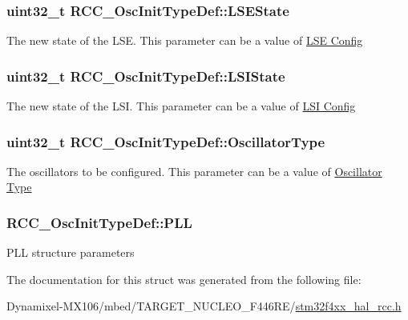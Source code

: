 \subsubsection[{\texorpdfstring{L\+S\+E\+State}{LSEState}}]{\setlength{\rightskip}{0pt plus 5cm}uint32\+\_\+t R\+C\+C\+\_\+\+Osc\+Init\+Type\+Def\+::\+L\+S\+E\+State}\hypertarget{struct_r_c_c___osc_init_type_def_a7c1294e9407e69e80fe034caf35fe7ea}{}\label{struct_r_c_c___osc_init_type_def_a7c1294e9407e69e80fe034caf35fe7ea}
The new state of the L\+SE. This parameter can be a value of \hyperlink{group___r_c_c___l_s_e___config}{L\+SE Config} 
\subsubsection[{\texorpdfstring{L\+S\+I\+State}{LSIState}}]{\setlength{\rightskip}{0pt plus 5cm}uint32\+\_\+t R\+C\+C\+\_\+\+Osc\+Init\+Type\+Def\+::\+L\+S\+I\+State}\hypertarget{struct_r_c_c___osc_init_type_def_a955de90db8882fde02c4fb59c7c000f0}{}\label{struct_r_c_c___osc_init_type_def_a955de90db8882fde02c4fb59c7c000f0}
The new state of the L\+SI. This parameter can be a value of \hyperlink{group___r_c_c___l_s_i___config}{L\+SI Config} 
\subsubsection[{\texorpdfstring{Oscillator\+Type}{OscillatorType}}]{\setlength{\rightskip}{0pt plus 5cm}uint32\+\_\+t R\+C\+C\+\_\+\+Osc\+Init\+Type\+Def\+::\+Oscillator\+Type}\hypertarget{struct_r_c_c___osc_init_type_def_af9e7bc89cab81c1705d94c74c7a81088}{}\label{struct_r_c_c___osc_init_type_def_af9e7bc89cab81c1705d94c74c7a81088}
The oscillators to be configured. This parameter can be a value of \hyperlink{group___r_c_c___oscillator___type}{Oscillator Type} 
\subsubsection[{\texorpdfstring{P\+LL}{PLL}}]{ R\+C\+C\+\_\+\+Osc\+Init\+Type\+Def\+::\+P\+LL}\hypertarget{struct_r_c_c___osc_init_type_def_af76de5ee86798f0c3a4c83c84dfa58be}{}\label{struct_r_c_c___osc_init_type_def_af76de5ee86798f0c3a4c83c84dfa58be}
P\+LL structure parameters 

The documentation for this struct was generated from the following file\+:\begin{DoxyCompactItemize}
\item 
Dynamixel-\/\+M\+X106/mbed/\+T\+A\+R\+G\+E\+T\+\_\+\+N\+U\+C\+L\+E\+O\+\_\+\+F446\+R\+E/\hyperlink{stm32f4xx__hal__rcc_8h}{stm32f4xx\+\_\+hal\+\_\+rcc.\+h}\end{DoxyCompactItemize}
